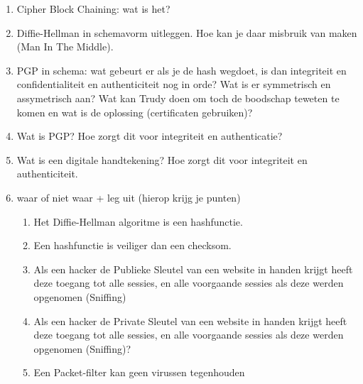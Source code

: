 \begin{enumerate}
\enumeratext{}

\item Cipher Block Chaining: wat is het?

\enumeratext{}

\item Diffie-Hellman in schemavorm uitleggen. Hoe kan je daar misbruik van maken (Man In The Middle).

\enumeratext{}

\item PGP in schema: wat gebeurt er als je de hash wegdoet, is dan integriteit en confidentialiteit en authenticiteit nog in orde? Wat is er symmetrisch en assymetrisch aan? Wat kan Trudy doen om toch de boodschap teweten te komen en wat is de oplossing (certificaten gebruiken)?

\enumeratext{}

\item Wat is PGP? Hoe zorgt dit voor integriteit en authenticatie?

\enumeratext{}

\item Wat is een digitale handtekening? Hoe zorgt dit voor integriteit en authenticiteit.

\enumeratext{}

\clearpage

\item	waar of niet waar + leg uit (hierop krijg je punten)
    \begin{enumerate} %
        \item Het Diffie-Hellman algoritme is een hashfunctie.

\enumeratext{}

        \item Een hashfunctie is veiliger dan een checksom.

\enumeratext{}

        \item Als een hacker de Publieke Sleutel van een website in handen krijgt heeft deze toegang tot alle sessies, en alle voorgaande sessies als deze werden opgenomen (Sniffing)

\enumeratext{}

        \item Als een hacker de Private Sleutel van een website in handen krijgt heeft deze toegang tot alle sessies, en alle voorgaande sessies als deze werden opgenomen (Sniffing)?

\enumeratext{}

        \item Een Packet-filter kan geen virussen tegenhouden


\end{enumerate}
\end{enumerate}
